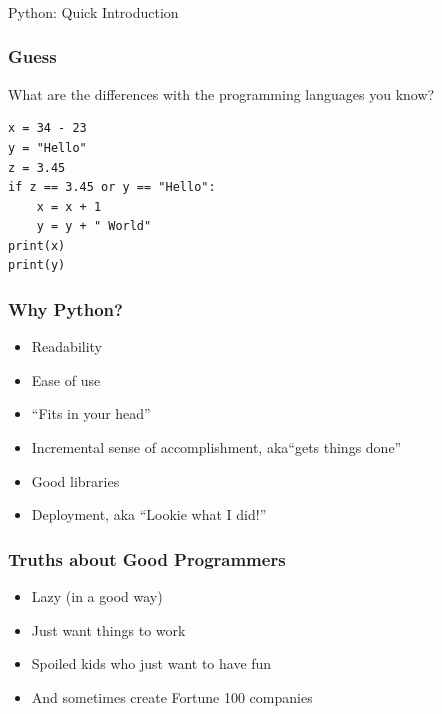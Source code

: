 \begin{frame}[fragile]\frametitle{}
\begin{center}
{\Large Python: Quick Introduction}
\end{center}
\end{frame}


\begin{frame}[fragile]\frametitle{Guess}
What are the differences with the programming languages you know?


\begin{lstlisting}
x = 34 - 23
y = "Hello"
z = 3.45
if z == 3.45 or y == "Hello":
	x = x + 1
	y = y + " World"
print(x)
print(y)
\end{lstlisting}
\end{frame}

\begin{frame} \frametitle{Why Python?}
\begin{itemize}
\item  Readability
\item Ease of use
\item ``Fits in your head''
\item Incremental sense of accomplishment, aka``gets things done''
\item Good libraries
\item Deployment, aka ``Lookie what I did!''
\end{itemize}
\end{frame}

\begin{frame}[fragile]\frametitle{Truths about Good Programmers}
    \begin{itemize}
    \item Lazy (in a good way)
    \item Just want things to work
    \item Spoiled kids who just want to have fun
    \item And sometimes create Fortune 100 companies
    \end{itemize}
\end{frame}

